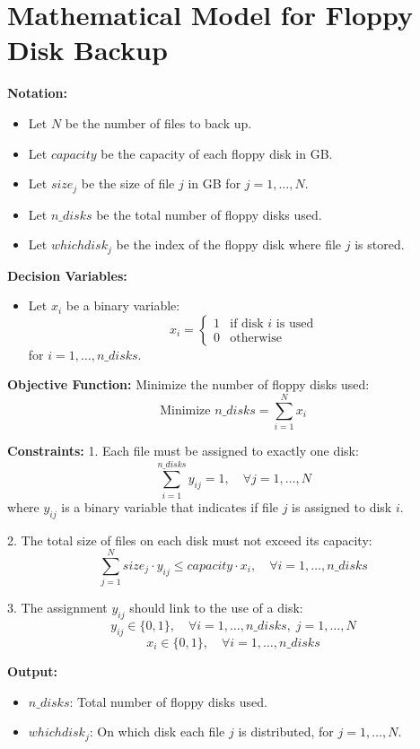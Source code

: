 \documentclass{article}
\begin{document}
\section*{Mathematical Model for Floppy Disk Backup}

\textbf{Notation:}
\begin{itemize}
    \item Let $N$ be the number of files to back up.
    \item Let $capacity$ be the capacity of each floppy disk in GB.
    \item Let $size_j$ be the size of file $j$ in GB for $j = 1, \ldots, N$.
    \item Let $n\_disks$ be the total number of floppy disks used.
    \item Let $whichdisk_j$ be the index of the floppy disk where file $j$ is stored.
\end{itemize}

\textbf{Decision Variables:}
\begin{itemize}
    \item Let $x_{i}$ be a binary variable:
    \[
    x_i = 
    \begin{cases} 
    1 & \text{if disk } i \text{ is used} \\
    0 & \text{otherwise}
    \end{cases}
    \]
    for $i = 1, \ldots, n\_disks$.
\end{itemize}

\textbf{Objective Function:}
Minimize the number of floppy disks used:
\[
\text{Minimize } n\_disks = \sum_{i=1}^{N} x_i
\]

\textbf{Constraints:}
1. Each file must be assigned to exactly one disk:
\[
\sum_{i=1}^{n\_disks} y_{ij} = 1, \quad \forall j = 1, \ldots, N
\]
where $y_{ij}$ is a binary variable that indicates if file $j$ is assigned to disk $i$.

2. The total size of files on each disk must not exceed its capacity:
\[
\sum_{j=1}^{N} size_j \cdot y_{ij} \leq capacity \cdot x_i, \quad \forall i = 1, \ldots, n\_disks
\]

3. The assignment $y_{ij}$ should link to the use of a disk:
\[
y_{ij} \in \{0, 1\}, \quad \forall i = 1, \ldots, n\_disks, \; j = 1, \ldots, N
\]
\[
x_i \in \{0, 1\}, \quad \forall i = 1, \ldots, n\_disks
\]

\textbf{Output:}
\begin{itemize}
    \item $n\_disks$: Total number of floppy disks used.
    \item $whichdisk_j$: On which disk each file $j$ is distributed, for $j = 1, \ldots, N$.
\end{itemize}
\end{document}
